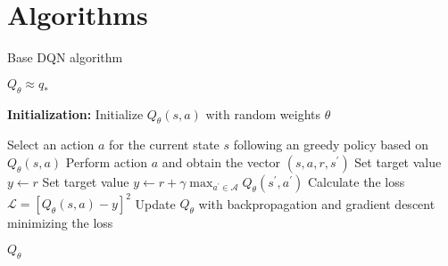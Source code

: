 \chapter{Algorithms}

\begin{algorithm}
\caption{Base DQN algorithm}
\label{alg:dqn1}
\begin{algorithmic}
    \ENSURE $Q_\theta \approx q_*$
    \STATE

    \STATE \textbf{Initialization:}
    \STATE Initialize $Q_\theta(s,a)$ with random weights $\theta$
    \STATE
    
            \STATE Select an action $a$ for the current state $s$ following an greedy policy based on $Q_\theta(s,a)$
            \STATE Perform action $a$ and obtain the vector $(s,a,r,s^\prime)$
                \STATE Set target value $y \gets r$
            \ELSE
                \STATE Set target value $y \gets r + \gamma \max_{a^\prime \in \mathcal{A}} Q_\theta(s^\prime,a^\prime)$
            \ENDIF
            \STATE Calculate the loss $\mathcal{L} = [Q_\theta(s,a)-y]^2$
            \STATE Update $Q_\theta$ with backpropagation and gradient descent minimizing the loss
        \ENDFOR
    \ENDFOR
    \STATE
    
    \RETURN $Q_\theta$
\end{algorithmic}
\end{algorithm}


